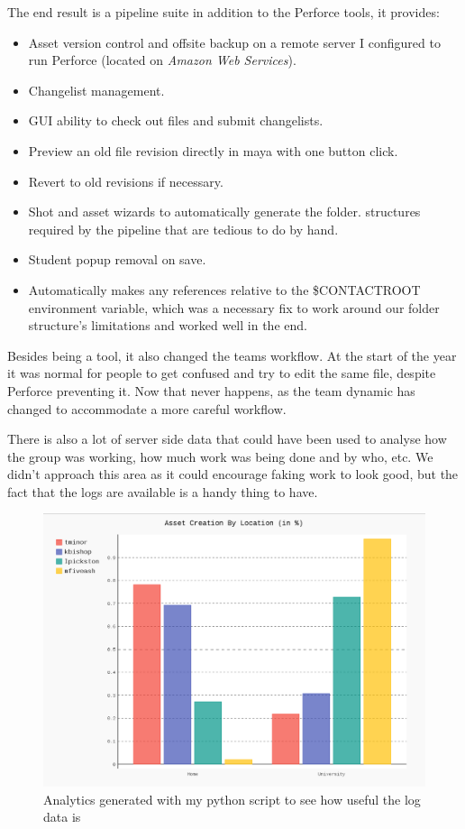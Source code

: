 \documentclass[11pt,a4paper,final,notitlepage]{report}
\begin{document}
The end result is a pipeline suite in addition to the Perforce tools, it provides:
\begin{itemize}
	\item Asset version control and offsite backup on a remote server I configured to run Perforce (located on \textit{Amazon Web Services}).
	\item Changelist management.
	\item GUI ability to check out files and submit changelists.
	\item Preview an old file revision directly in maya with one button click.
	\item Revert to old revisions if necessary.
	\item Shot and asset wizards to automatically generate the folder. structures required by the pipeline that are tedious to do by hand.
	\item Student popup removal on save.
	\item Automatically makes any references relative to the \$CONTACTROOT environment variable, which was a necessary fix to work around our folder structure's limitations and worked well in the end.
\end{itemize}

Besides being a tool, it also changed the teams workflow. At the start of the year it was normal for people to get confused and try to edit the same file, despite Perforce preventing it. Now that never happens, as the team dynamic has changed to accommodate a more careful workflow.

There is also a lot of server side data that could have been used to analyse how the group was working, how much work was being done and by who, etc. We didn't approach this area as it could encourage faking work to look good, but the fact that the logs are available is a handy thing to have. 

\begin{figure}[h!]
	\includegraphics[width=\textwidth]{images/graph.png}
	\caption{Analytics generated with my python script to see how useful the log data is}
	\label{fig:graph}
\end{figure}
\end{document}
